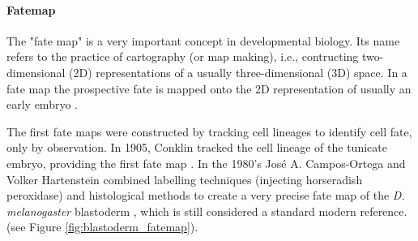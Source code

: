 \clearpage
\begin{mdframed}[style=boxstyle,frametitle={Box1. Fate maps and gene expression maps }]
\label{Box2:Fatemap}

\paragraph{Fatemap}
The "fate map" is a very important concept in developmental biology. 
Its name refers to the practice of cartography (or map making), i.e., contructing two-dimensional (2D) representations of a usually three-dimensional (3D) space.
In a fate map the prospective fate is mapped onto the 2D representation of usually an early embryo \citep{gilbert2007fatemap}.

The first fate maps were constructed by tracking cell lineages to identify cell fate, only by observation. In 1905, Conklin tracked the cell lineage of the tunicate embryo, providing the first fate map \citep{Conklin1905}. 
In the 1980's Jos\'{e} A. Campos-Ortega and Volker Hartenstein combined labelling techniques (injecting horseradish peroxidase) and histological methods to create a very precise fate map of the \textit{D. melanogaster} blastoderm \citep{Campos-Ortega1985}, which is still considered a standard modern reference.
(see Figure \ref{fig:blastoderm_fatemap}).


\end{mdframed}
